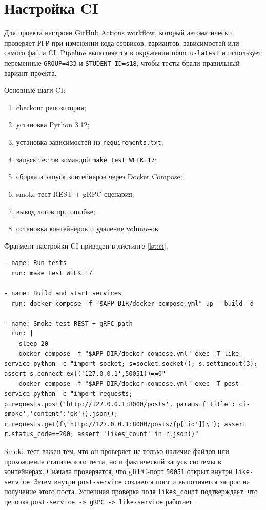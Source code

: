 \section{Настройка CI}

Для проекта настроен GitHub Actions workflow, который автоматически проверяет РГР при изменении
кода сервисов, вариантов, зависимостей или самого файла CI. Pipeline выполняется в окружении
\texttt{ubuntu-latest} и использует переменные \texttt{GROUP=433} и \texttt{STUDENT\_ID=s18},
чтобы тесты брали правильный вариант проекта.

Основные шаги CI:
\begin{enumerate}
    \item checkout репозитория;
    \item установка Python 3.12;
    \item установка зависимостей из \texttt{requirements.txt};
    \item запуск тестов командой \texttt{make test WEEK=17};
    \item сборка и запуск контейнеров через Docker Compose;
    \item smoke-тест REST + gRPC-сценария;
    \item вывод логов при ошибке;
    \item остановка контейнеров и удаление volume-ов.
\end{enumerate}

Фрагмент настройки CI приведен в листинге \ref{lst:ci}.

\begin{lstlisting}[caption={Фрагмент GitHub Actions CI}, label={lst:ci}]
- name: Run tests
  run: make test WEEK=17

- name: Build and start services
  run: docker compose -f "$APP_DIR/docker-compose.yml" up --build -d

- name: Smoke test REST + gRPC path
  run: |
    sleep 20
    docker compose -f "$APP_DIR/docker-compose.yml" exec -T like-service python -c "import socket; s=socket.socket(); s.settimeout(3); assert s.connect_ex(('127.0.0.1',50051))==0"
    docker compose -f "$APP_DIR/docker-compose.yml" exec -T post-service python -c "import requests; p=requests.post('http://127.0.0.1:8000/posts', params={'title':'ci-smoke','content':'ok'}).json(); r=requests.get(f\"http://127.0.0.1:8000/posts/{p['id']}\"); assert r.status_code==200; assert 'likes_count' in r.json()"
\end{lstlisting}

Smoke-тест важен тем, что он проверяет не только наличие файлов или прохождение статического
теста, но и фактический запуск системы в контейнерах. Сначала проверяется, что gRPC-порт
\texttt{50051} открыт внутри \texttt{like-service}. Затем внутри \texttt{post-service} создается
пост и выполняется запрос на получение этого поста. Успешная проверка поля \texttt{likes\_count}
подтверждает, что цепочка \texttt{post-service -> gRPC -> like-service} работает.

